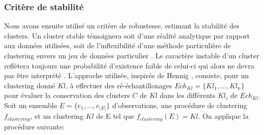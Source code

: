 \subsubsection{Critère de stabilité} 
Nous avons ensuite utilisé un critère de robustesse, estimant la stabilité des clusters. Un cluster stable témoignera soit d'une réalité analytique par rapport aux données utilisées, soit de l'inflexibilité d'une méthode particulière de clustering envers un jeu de données particulier \citep{hennig2007cluster}. Le caractère instable d'un cluster reflètera toujours une probabilité d'existence faible de celui-ci qui alors ne devra pas être interprété \citep{hennig2007cluster}.
L'approche utilisée, inspirée de Hennig \citep{hennig2007cluster}, consiste, pour un clustering donné $Kl$, à effectuer des ré-échantillonages $Ech_{Kl}=\{Kl_{1},...,Kl_{n}\} $ pour évaluer la conservation des clusters $C$ de $Kl$ dans les différents $Kl_{i}$ de $Ech_{Kl}$.
\\
Soit un ensemble $E=\{e_{1},...,e_{|E|}\}$ d'observations, une procédure de clustering $f_{clustering}$, et un clustering $Kl$ de E tel que $f_{clustering}(E)=Kl$. On applique la procédure suivante:
	\\\\
